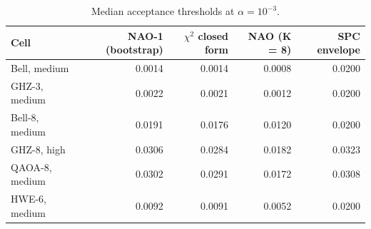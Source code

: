 \begin{table}[t]
\centering
\caption{Median acceptance thresholds at $\alpha = 10^{-3}$.}
\label{tab:rq1-thresholds}
\small
\begin{tabular}{lrrrr}
\toprule
Cell & NAO-1 (bootstrap) & $\chi^2$ closed form & NAO (K = 8) & SPC envelope \\
\midrule
Bell, medium & 0.0014 & 0.0014 & 0.0008 & 0.0200 \\
GHZ-3, medium & 0.0022 & 0.0021 & 0.0012 & 0.0200 \\
Bell-8, medium & 0.0191 & 0.0176 & 0.0120 & 0.0200 \\
GHZ-8, high & 0.0306 & 0.0284 & 0.0182 & 0.0323 \\
QAOA-8, medium & 0.0302 & 0.0291 & 0.0172 & 0.0308 \\
HWE-6, medium & 0.0092 & 0.0091 & 0.0052 & 0.0200 \\
\bottomrule
\end{tabular}
\end{table}
